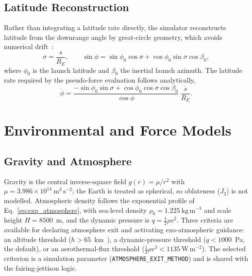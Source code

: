 \subsection{Latitude Reconstruction}
\label{ssec:latitude}

Rather than integrating a latitude rate directly, the simulator reconstructs
latitude from the downrange angle by great-circle geometry, which avoids
numerical drift~\cite{BateMuellerWhite1971Fundamentals}:
\begin{equation}
  \sigma = \frac{s}{R_E}, \qquad
  \sin\phi = \sin\phi_0\cos\sigma + \cos\phi_0\sin\sigma\cos\beta_0,
  \label{eq:lat_recon}
\end{equation}
where $\phi_0$ is the launch latitude and $\beta_0$ the inertial launch azimuth.
The latitude rate required by the pseudo-force evaluation follows analytically,
\begin{equation}
  \dot\phi = \frac{-\sin\phi_0\sin\sigma
    + \cos\phi_0\cos\sigma\cos\beta_0}{\cos\phi}\;\frac{\dot s}{R_E}.
  \label{eq:phidot}
\end{equation}

\section{Environmental and Force Models}
\label{sec:models}

\subsection{Gravity and Atmosphere}
\label{ssec:gravity_atm}

Gravity is the central inverse-square field $g(r)=\mu/r^{2}$ with
$\mu=3.986\times10^{14}~\mathrm{m^{3}\,s^{-2}}$; the Earth is treated as
spherical, so oblateness ($J_2$) is not modelled. Atmospheric density follows the
exponential profile of Eq.~\eqref{eq:exp_atmosphere}, with sea-level density
$\rho_0=1.225~\mathrm{kg\,m^{-3}}$ and scale height $H=8500$~m, and the dynamic
pressure is $q=\tfrac12\rho v^{2}$. Three criteria are available for declaring
atmosphere exit and activating exo-atmospheric guidance: an altitude threshold
($h>65$~km~\cite{kluever2018space}), a dynamic-pressure threshold
($q<1000$~Pa, the default), or an aerothermal-flux threshold
($\tfrac12\rho v^{3}<1135~\mathrm{W\,m^{-2}}$). The selected criterion is a
simulation parameter (\texttt{ATMOSPHERE\_EXIT\_METHOD}) and is shared with the
fairing-jettison logic.

